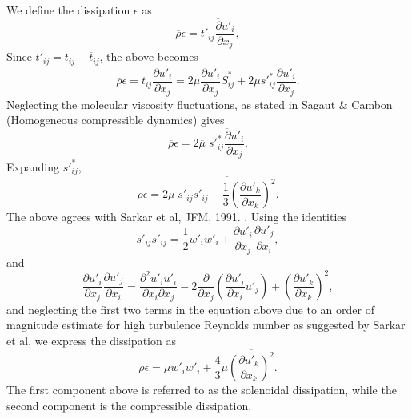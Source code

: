 \documentclass[oneside,a4paper,11pt]{report}
\newcommand{\rhoavg}{\overline{\rho}}
\newcommand{\tavg}{\overline{t}}
\newcommand{\Savg}{\overline{S}}
\newcommand{\sfluc}{s'}
\newcommand{\tfluc}{t'}
\newcommand{\ufluc}{u'}
\newcommand{\wfluc}{w'}
\begin{document}
We define the dissipation $\epsilon$ as
\begin{equation}
\rhoavg \epsilon = \overline{ \tfluc_{ij} \frac{ \partial \ufluc_i }{\partial x_j } } ,
\end{equation}
Since $\tfluc_{ij} = t_{ij} - \tavg_{ij}$, the above becomes
\begin{equation}
    \rhoavg \epsilon = \overline{ t_{ij} \frac{\partial \ufluc_i}{\partial x_j} } = \overline{ 2 \mu \frac{\partial \ufluc_i}{\partial x_j} } \Savg^*_{ij} + \overline{ 2 \mu \sfluc^*_{ij} \frac{\partial \ufluc_i}{\partial x_j} }.
\end{equation}
Neglecting the molecular viscosity fluctuations, as stated in Sagaut \& Cambon (Homogeneous compressible dynamics) gives
\begin{equation}
    \rhoavg \epsilon = 2 \overline{ \mu } \; \overline{ \sfluc^*_{ij} \frac{\partial \ufluc_i}{\partial x_j} }.
\end{equation}
Expanding $\sfluc^*_{ij}$,
\begin{equation}
    \rhoavg \epsilon = 2 \overline{ \mu } \; \overline{ \sfluc_{ij} \sfluc_{ij} - \frac{1}{3} \left ( \frac{ \partial \ufluc_k }{ \partial x_k } \right )^2 }.
\end{equation}
The above agrees with Sarkar et al, JFM, 1991. \cite{Sarkar1991}. Using the identities 
\begin{equation}
\sfluc_{ij} \sfluc_{ij} = \frac{1}{2} \wfluc_i \wfluc_i + \frac{ \partial \ufluc_i }{ \partial x_j } \frac{ \partial \ufluc_j }{ \partial x_i}, 
\end{equation}
and
\begin{equation}
\frac{ \partial \ufluc_i }{ \partial x_j } \frac{ \partial \ufluc_j }{ \partial x_i } = \frac{ \partial^2 \ufluc_i \ufluc_i }{ \partial x_i \partial x_j}  -2 \frac{ \partial }{ \partial x_j } \left ( \frac{ \partial \ufluc_i }{ \partial x_i } \ufluc_j \right ) + \left ( \frac{ \partial \ufluc_k }{ \partial x_k } \right )^2 ,
\end{equation}
and neglecting the first two terms in the equation above due to an order of magnitude estimate for high turbulence Reynolds number as suggested by Sarkar et al, we express the dissipation as
\begin{equation}
\rhoavg \epsilon = \overline{ \mu } \overline{ \wfluc_i \wfluc_i } + \frac{4}{3} \overline{ \mu } \overline{ \left ( \frac{ \partial \ufluc_k }{ \partial x_k } \right )^2 }.
\end{equation}
The first component above is referred to as the solenoidal dissipation, while the second component is the compressible dissipation.
\end{document}
